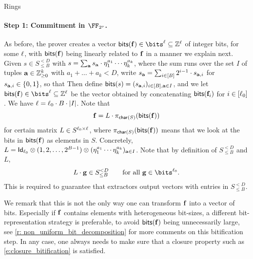\begin{lncsmove}{Rings}
 \paragraph{Step 1: Commitment in $\comfield$.}  As before, the prover creates a vector $\bitstext(\bff) \in \bits^{\codedim} \subseteq \ZZ^{\codedim}$ of integer bits, for some $\codedim$, with $\bitstext(\bff)$ being linearly related to $\bff$ in a manner we explain next. Given $s\in S_{\leq B}^{<D}$ with $s = \sum_{\aa} s_\aa \cdot \eta_1^{a_1}\cdots \eta_{k}^{a_k}$, where the sum runs over the set $I$ of tuples $\aa\in \ZZ_{\geq 0}^k$ with $a_1+\ldots+a_k<D$, write $s_\aa =\sum_{i\in [B]} 2^{i-1}\cdot s_{\aa,i}$ for $s_{\aa,i}\in \{0,1\}$, so that
%
%
Then define $\bitstext(s)=(s_{\aa,i})_{i \in [B], \aa\in I}$, and we let $\bitstext(\bff)\in\bits^{\codedim}\subseteq \ZZ^\codedim$ be the vector obtained by concatenating $\bitstext(\bff_i)$ for $i\in [\codedim_0]$. We have $\codedim=\codedim_0\cdot B\cdot |I|$.  Note that 
%
\begin{equation}\label{e:new_to_linear_bits_to_f}
\bff = L \cdot \pi_{\Char(S)}(\bitstext(\bff))
\end{equation}
for certain matrix $L\in S^{\codedim_0 \times \codedim}$, where $\pi_{\Char(S)}(\bitstext(\bff))$ means that we look at the bits in $\bitstext(\bff)$ as elements in $S$. Concretely, $L= \mathsf{Id}_{\codedim_0} \otimes (1, 2, \ldots, 2^{B-1}) \otimes (\eta_1^{a_1}\cdots \eta_k^{a_k})_{\aa\in I}$. Note that by definition of $S_{\leq B}^{<D}$ and $L$,  \begin{equation}\label{e:closure_bitification}L\cdot \bfg \in S_{\leq B}^{<D} \qquad \text{for all } \bfg \in \bits^{\codedim_0}.\end{equation} This is required to guarantee that extractors output vectors with entries in  $S_{\leq B}^{<D}$.

We remark that this is not the only way one can transform $\bff$ into a vector of bits. Especially if $\bff$ contains elements with heterogeneous bit-sizes, a different bit-representation strategy is preferable, to avoid $\bitstext(\bff)$ being unnecessarily large, see \cref{r: non_uniform_bit_decomposition} for more comments on this bitification step. In any case, one always needs to make sure that a closure property such as \eqref{e:closure_bitification} is satisfied.
 


\bigskip


\end{lncsmove}

